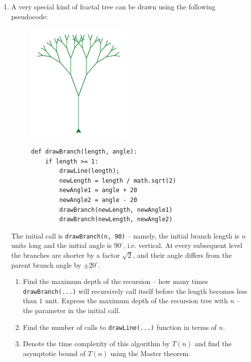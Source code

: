 \documentclass[a4paper,12pt]{article}
\begin{document}
\begin{enumerate}
\newpage

\item A very special kind of fractal tree can be drawn using the following 
pseudocode:

\begin{figure}[!htb]
\begin{minipage}{.35\textwidth}
\centering
\includegraphics[width=2in]{fractal-tree.png}
\label{fig:fractal-tree}
\end{minipage}%
\begin{minipage}{0.65\textwidth}
\begin{Verbatim}
def drawBranch(length, angle):
    if length >= 1:
        drawLine(length);
        newLength = length / math.sqrt(2)
        newAngle1 = angle + 20
        newAngle2 = angle - 20
        drawBranch(newLength, newAngle1)
        drawBranch(newLength, newAngle2)
\end{Verbatim}
\end{minipage}
\end{figure}

The initial call is {\tt drawBranch(n, 90)} -- namely, 
the initial branch length is $n$ units long and the initial angle is 
$90^{\circ}$, i.e. vertical. At every subsequent level the branches
are shorter by a factor $\sqrt{2}$, and their angle differs
from the parent branch angle by $\pm 20^{\circ}$. 

\begin{enumerate}
\item Find the maximum depth of the recursion -- how many times 
{\tt drawBranch(...)} will recursively call itself before the 
length becomes less than $1$ unit. Express the maximum depth 
of the recursion tree with $n$ -- the parameter in the 
initial call. 
\item Find the number of calls to {\tt drawLine(...)} function
in terms of $n$. 
\item Denote the time complexity of this algorithm by $T(n)$
and find the asymptotic bound of $T(n)$ using the Master theorem. 
\end{enumerate}




\end{enumerate}
\end{document}
